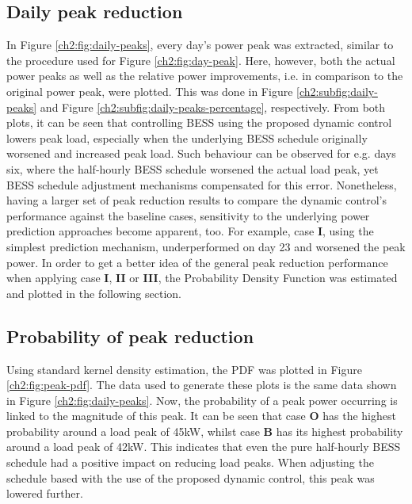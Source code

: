 \subsection{Daily peak reduction}



In Figure \ref{ch2:fig:daily-peaks}, every day's power peak was extracted, similar to the procedure used for Figure \ref{ch2:fig:day-peak}.
Here, however, both the actual power peaks as well as the relative power improvements, i.e. in comparison to the original power peak, were plotted.
This was done in Figure \ref{ch2:subfig:daily-peaks} and Figure \ref{ch2:subfig:daily-peaks-percentage}, respectively.
From both plots, it can be seen that controlling BESS using the proposed dynamic control lowers peak load, especially when the underlying BESS schedule originally worsened and increased peak load.
Such behaviour can be observed for e.g. days six, where the half-hourly BESS schedule worsened the actual load peak, yet BESS schedule adjustment mechanisms compensated for this error.
Nonetheless, having a larger set of peak reduction results to compare the dynamic control's performance against the baseline cases, sensitivity to the underlying power prediction approaches become apparent, too.
For example, case \textbf{I}, using the simplest prediction mechanism, underperformed on day 23 and worsened the peak power.
In order to get a better idea of the general peak reduction performance when applying case \textbf{I}, \textbf{II} or \textbf{III}, the Probability Density Function was estimated and plotted in the following section.

\subsection{Probability of peak reduction}



Using standard kernel density estimation, the PDF was plotted in Figure \ref{ch2:fig:peak-pdf}.
The data used to generate these plots is the same data shown in Figure \ref{ch2:fig:daily-peaks}.
Now, the probability of a peak power occurring is linked to the magnitude of this peak.
It can be seen that case \textbf{O} has the highest probability around a load peak of 45kW, whilst case \textbf{B} has its highest probability around a load peak of 42kW.
This indicates that even the pure half-hourly BESS schedule had a positive impact on reducing load peaks.
When adjusting the schedule based with the use of the proposed dynamic control, this peak was lowered further.

